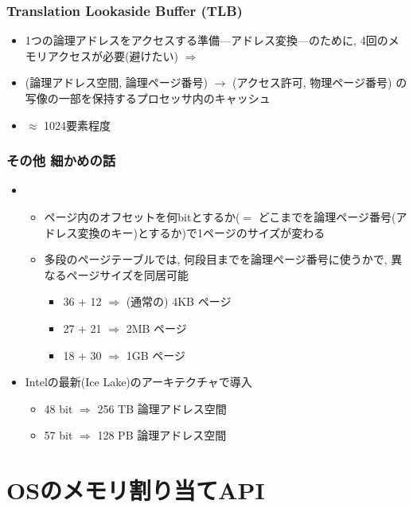 \documentclass[12pt,dvipdfmx]{beamer}
\begin{document}
\begin{frame}
  \frametitle{Translation Lookaside Buffer (TLB)}
  \begin{itemize}
  \item 1つの論理アドレスをアクセスする準備---アドレス変換---のために,
    4回のメモリアクセスが必要(避けたい)
    $\Rightarrow$ 
  \item
    (論理アドレス空間, 論理ページ番号) $\rightarrow$ (アクセス許可, 物理ページ番号)
    の写像の一部を保持するプロセッサ内のキャッシュ
  \item $\approx$ 1024要素程度
  \end{itemize}
\end{frame}

\begin{frame}
  \frametitle{その他 細かめの話}
  \begin{itemize}
  \item {}
    \begin{itemize}
    \item ページ内のオフセットを何bitとするか($=$ どこまでを論理ページ番号(アドレス変換のキー)とするか)で1ページのサイズが変わる
    \item 多段のページテーブルでは, 何段目までを論理ページ番号に使うかで,
      異なるページサイズを同居可能
      \begin{itemize}
      \item 36 + 12 $\Rightarrow$ (通常の) 4KB ページ
      \item 27 + 21 $\Rightarrow$ 2MB ページ
      \item 18 + 30 $\Rightarrow$ 1GB ページ
      \end{itemize}
    \end{itemize}
  \item {}
    Intelの最新(Ice Lake)のアーキテクチャで導入
    \begin{itemize}
    \item 48 bit $\Rightarrow$ 256 TB 論理アドレス空間
    \item 57 bit $\Rightarrow$ 128 PB 論理アドレス空間
    \end{itemize}
  \end{itemize}
\end{frame}

\section{OSのメモリ割り当てAPI}
\end{document}
